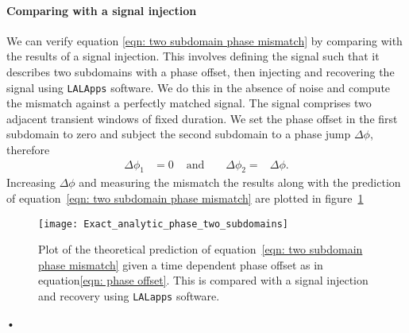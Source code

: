 \paragraph{Comparing with a signal injection} We can verify equation
\eqref{eqn: two subdomain phase mismatch} by comparing with the results of a
signal injection. This involves defining the signal such that it describes two
subdomains with a phase offset, then injecting and recovering the signal using
\texttt{LALApps} software. We do this in the absence of noise and compute the mismatch 
against a perfectly matched signal.  The signal comprises two adjacent
transient windows of fixed duration. We set the phase offset in the first subdomain
to zero and subject the second subdomain to a phase
jump $\Delta \phi$, therefore 
\begin{align}
    \Delta \phi_{1} &= 0 &  \textrm{ and } && \Delta \phi_{2} =& \Delta\phi.
\end{align}
Increasing $\Delta\phi$ and measuring the mismatch the results along
with the prediction of equation~\eqref{eqn: two subdomain phase mismatch} are
plotted in figure~\ref{fig: two plot}
\begin{figure}
\centering
\texttt{[image: Exact\_analytic\_phase\_two\_subdomains]}
\caption{Plot of the theoretical prediction of equation~\eqref{eqn: two subdomain
phase mismatch} given a time dependent phase offset as in equation\eqref{eqn:
phase offset}. This is compared  with a signal injection and recovery
using \texttt{LALapps} software.}
\label{fig: two plot}
\end{figure}•

\FloatBarrier
